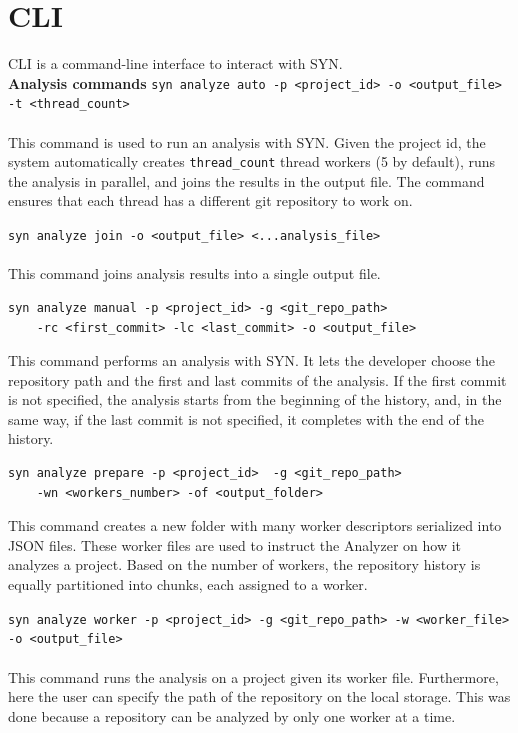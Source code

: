 \section{CLI}
CLI is a command-line interface to interact with SYN.
\\
\textbf{Analysis commands}
\lstinline{syn analyze auto -p <project_id> -o <output_file> -t <thread_count>}\\
\\
This command is used to run an analysis with SYN. 
Given the project id, the system automatically creates \texttt{thread\_count} thread workers (5 by default), runs the analysis in parallel, and joins the results in the output file. The command ensures that each thread has a different git repository to work on. 


\lstinline{syn analyze join -o <output_file> <...analysis_file>}\\
\\
This command joins analysis results into a single output file.

\begin{lstlisting}
syn analyze manual -p <project_id> -g <git_repo_path>
    -rc <first_commit> -lc <last_commit> -o <output_file>
\end{lstlisting}

This command performs an analysis with SYN. It lets the developer choose the repository path and the first and last commits of the analysis. 
If the first commit is not specified, the analysis starts from the beginning of the history, and, in the same way, if the last commit is not specified, it completes with the end of the history. 


\begin{lstlisting}
syn analyze prepare -p <project_id>  -g <git_repo_path> 
    -wn <workers_number> -of <output_folder>
\end{lstlisting}

This command creates a new folder with many worker descriptors serialized into JSON files. These worker files are used to instruct the Analyzer on how it analyzes a project.
Based on the number of workers, the repository history is equally partitioned into chunks, each assigned to a worker. 


\lstinline{syn analyze worker -p <project_id> -g <git_repo_path> -w <worker_file> -o <output_file>}\\
\\
This command runs the analysis on a project given its worker file. 
Furthermore, here the user can specify the path of the repository on the local storage. This was done because a repository can be analyzed by only one worker at a time.

